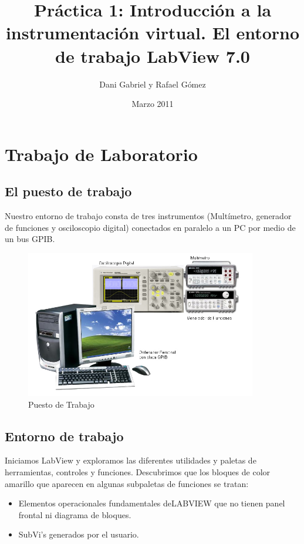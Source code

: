 \documentclass[10pt,a4paper,catalan]{article}
\title{Pr\'actica 1: Introducci\'on a la instrumentaci\'on virtual. El entorno de trabajo LabView 7.0}
\author{Dani Gabriel y Rafael G\'omez}
\date{Marzo 2011}
\begin{document}
\pagebreak

\maketitle

\tableofcontents

\pagebreak

\section{Trabajo de Laboratorio}

\subsection{El puesto de trabajo}

Nuestro entorno de trabajo consta de tres instrumentos (Mult\'imetro, generador de funciones y osciloscopio digital) conectados en paralelo a un PC por medio de un bus GPIB. 

\begin{figure}[H]
 \centering
 \includegraphics[width=0.9\textwidth]{capturas/entorno}
 \caption{Puesto de Trabajo}
 \label{fig:entorno}
\end{figure}

\subsection{Entorno de trabajo}

Iniciamos LabView y exploramos las diferentes utilidades y paletas de herramientas, controles y funciones. Descubrimos que los bloques de color amarillo que aparecen en algunas subpaletas de funciones se tratan:

\begin{itemize}
 \item Elementos operacionales fundamentales deLABVIEW que no tienen panel frontal ni diagrama de bloques.
 \item SubVi's generados por el usuario.
\end{itemize}
\end{document}
